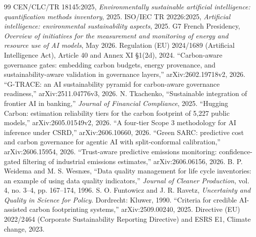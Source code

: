 \documentclass[10pt,conference]{IEEEtran}
\begin{document}
\begin{thebibliography}{99}
\footnotesize
{} CEN/CLC/TR 18145:2025, \emph{Environmentally sustainable
artificial intelligence: quantification methods inventory}, 2025.
 ISO/IEC TR 20226:2025, \emph{Artificial intelligence:
environmental sustainability aspects}, 2025.
 G7 French Presidency, \emph{Overview of initiatives for the
measurement and monitoring of energy and resource use of AI models}, May 2026.
 Regulation (EU) 2024/1689 (Artificial Intelligence Act),
Article 40 and Annex XI \S1(2d), 2024.
 ``Carbon-aware governance gates: embedding carbon budgets, energy
provenance, and sustainability-aware validation in governance layers,''
arXiv:2602.19718v2, 2026.
 ``G-TRACE: an AI sustainability pyramid for carbon-aware
governance readiness,'' arXiv:2511.04776v3, 2026.
 N. Tkachenko, ``Sustainable integration of frontier AI in
banking,'' \emph{Journal of Financial Compliance}, 2025.
 ``Hugging Carbon: estimation reliability tiers for the
carbon footprint of 5,227 public models,'' arXiv:2605.01549v2, 2026.
 ``A four-tier Scope 3 methodology for AI inference under
CSRD,'' arXiv:2606.10660, 2026.
 ``Green SARC: predictive cost and carbon governance for
agentic AI with split-conformal calibration,'' arXiv:2606.15954, 2026.
 ``Trust-aware predictive emissions monitoring:
confidence-gated filtering of industrial emissions estimates,''
arXiv:2606.06156, 2026.
 B. P. Weidema and M. S. Wesn\ae s, ``Data quality management
for life cycle inventories: an example of using data quality indicators,''
\emph{Journal of Cleaner Production}, vol. 4, no. 3--4, pp. 167--174, 1996.
 S. O. Funtowicz and J. R. Ravetz, \emph{Uncertainty and Quality
in Science for Policy}. Dordrecht: Kluwer, 1990.
 ``Criteria for credible AI-assisted carbon footprinting
systems,'' arXiv:2509.00240, 2025.
 Directive (EU) 2022/2464 (Corporate Sustainability Reporting
Directive) and ESRS E1, Climate change, 2023.
\end{thebibliography}
\end{document}
